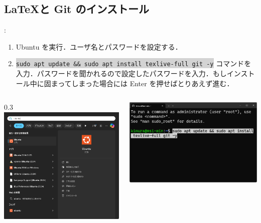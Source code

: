 \documentclass[aspectratio=169,dvipdfmx,cjk]{beamer}
\newcommand{\cmdline}[1]{
    \colorbox{lightgray}{\lstinline[style=command]{#1}}
}
\begin{document}
\subsection{\LaTeX と Git のインストール}
\begin{frame}{\insertsection \thesubsection: \insertsubsection}
  \begin{enumerate}
    \item Ubuntu を実行．ユーザ名とパスワードを設定する．
    \item \cmdline{sudo apt update && sudo apt install texlive-full git -y} コマンドを入力．パスワードを聞かれるので設定したパスワードを入力．もしインストール中に固まってしまった場合には Enter を押せばとりあえず進む\cite{LaTeXBug}．
  \end{enumerate}
  \begin{columns}
    \begin{column}{0.3\textwidth}
        \includegraphics[width=1.0\linewidth]{fig/start-ubuntu.png}
    \end{column}
    \begin{column}{0.45\textwidth}
      \includegraphics[width=1.0\linewidth]{fig/texlive.png}
    \end{column}
  \end{columns}
\end{frame}
\end{document}
